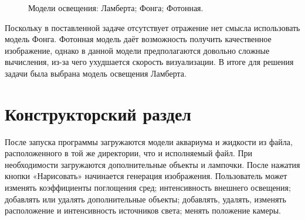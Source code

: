 \documentclass[14pt,a4paper]{extarticle}
\begin{document}
	    \begin{figure}[H]  
	    	\vspace{-4ex} \centering {}  
	    	\hspace{4ex}
	    	\hspace{4ex}
	    	\caption{Модели освещения:  Ламберта;  Фонга;  Фотонная.} \label{LightModel}
	    \end{figure}
    	
    	Поскольку в поставленной задаче отсутствует отражение нет смысла использовать модель Фонга. 
    	Фотонная модель даёт возможность получить качественное изображение, 
    	однако в данной модели предполагаются довольно сложные вычисления, из-за чего ухудшается скорость визуализации. 
    	В итоге для решения задачи была выбрана модель освещения Ламберта.
	    	
\clearpage
\section{Конструкторский раздел}  
	После запуска программы загружаются модели аквариума и жидкости из файла, 
	расположенного в той же директории, что и исполняемый файл. 
	При необходимости загружаются дополнительные объекты и лампочки. 
	После нажатия кнопки «Нарисовать» начинается генерация изображения. 
	Пользователь может изменять коэффициенты поглощения сред; интенсивность внешнего освещения; 
	добавлять или удалять дополнительные объекты; добавлять, удалять, изменять расположение и интенсивность источников света; 
	менять положение камеры.
\end{document}
